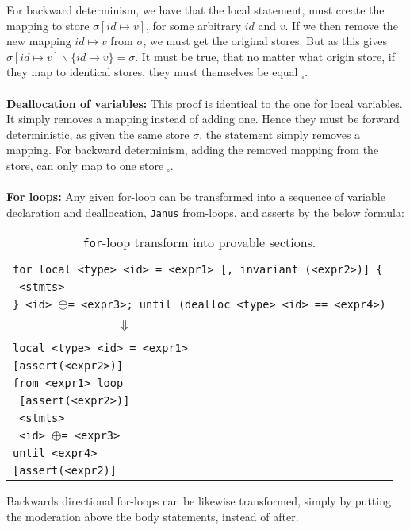 For backward determinism, we have that the local statement, must create the mapping to store
$\sigma[id \mapsto v]$, for some arbitrary $id$ and $v$. If we then remove the new mapping
$id \mapsto v$ from $\sigma$, we must get the original stores. But as this gives
$\sigma[id \mapsto v] \backslash \{id \mapsto v\} = \sigma$. It must be true, that no matter what
origin store, if they map to identical stores, they must themselves be equal $_\square$.
\\
\\
\textbf{Deallocation of variables:}
This proof is identical to the one for local variables. It simply removes a mapping instead of
adding one. Hence they must be forward deterministic, as given the same store $\sigma$, the 
statement simply removes a mapping. For backward determinism, adding the removed mapping from
the store, can only map to one store $_\square$.
\\
\\
\textbf{For loops:}
Any given \lan for-loop can be transformed into a sequence of \lan variable declaration and
deallocation, \texttt{Janus} from-loops, and \lan asserts by the below formula:

\begin{table}[H]
    \centering
    \begin{tabular}{l}
        \texttt{for local <type> <id> = <expr1> [, invariant (<expr2>)] \{} \\
        \texttt{ <stmts>} \\
        \texttt{\} <id> $\oplus$= <expr3>; until (dealloc <type> <id> == <expr4>)} \\ \\
        $~~~~~~~~~~~~~~~~~~~~~~~~~~~~~~~~~~~~~\Downarrow$ \\ \\
        \texttt{local <type> <id> = <expr1>} \\
        \texttt{[assert(<expr2>)]} \\
        \texttt{from <expr1> loop} \\
        \texttt{  [assert(<expr2>)]} \\
        \texttt{  <stmts>} \\
        \texttt{  <id> $\oplus$= <expr3>} \\
        \texttt{until <expr4>} \\
        \texttt{[assert(<expr2)]}
    \end{tabular}
    \caption{\texttt{for}-loop transform into provable sections.}
    \label{table:for-loop-transform}
\end{table}
\noindent
Backwards directional for-loops can be likewise transformed, simply by putting the
moderation above the body statements, instead of after.

